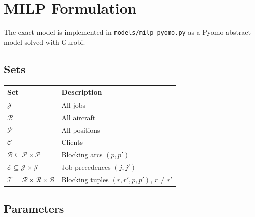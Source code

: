 \section{MILP Formulation}
\label{sec:milp}

The exact model is implemented in \texttt{models/milp\_pyomo.py} as a Pyomo
abstract model solved with Gurobi.

\subsection{Sets}

\begin{center}
\begin{tabular}{ll}
\toprule
Set & Description \\
\midrule
$\mathcal{J}$ & All jobs \\
$\mathcal{R}$ & All aircraft \\
$\mathcal{P}$ & All positions \\
$\mathcal{C}$ & Clients \\
$\mathcal{B} \subseteq \mathcal{P} \times \mathcal{P}$ & Blocking arcs $(p, p')$ \\
$\mathcal{E} \subseteq \mathcal{J} \times \mathcal{J}$ & Job precedences $(j, j')$ \\
$\mathcal{T} = \mathcal{R} \times \mathcal{R} \times \mathcal{B}$ &
    Blocking tuples $(r, r', p, p')$, $r \neq r'$ \\
\bottomrule
\end{tabular}
\end{center}

\subsection{Parameters}

